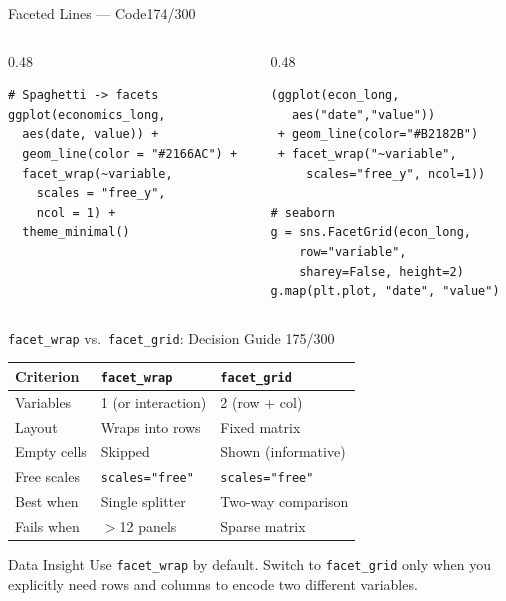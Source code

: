 \documentclass[10pt]{beamer}
\newcommand{\smark}[1]{\hfill{\scriptsize\color{codegray}#1}}
\begin{document}
\begin{frame}[fragile]{Faceted Lines --- Code}\smark{174/300}
\begin{columns}[T]
\begin{column}{0.48\textwidth}
\begin{lstlisting}[style=Rstyle]
# Spaghetti -> facets
ggplot(economics_long,
  aes(date, value)) +
  geom_line(color = "#2166AC") +
  facet_wrap(~variable,
    scales = "free_y",
    ncol = 1) +
  theme_minimal()
\end{lstlisting}
\end{column}
\begin{column}{0.48\textwidth}
\begin{lstlisting}[style=Pystyle]
(ggplot(econ_long,
   aes("date","value"))
 + geom_line(color="#B2182B")
 + facet_wrap("~variable",
     scales="free_y", ncol=1))

# seaborn
g = sns.FacetGrid(econ_long,
    row="variable",
    sharey=False, height=2)
g.map(plt.plot, "date", "value")
\end{lstlisting}
\end{column}
\end{columns}
\end{frame}

\begin{frame}{\texttt{facet\_wrap} vs.\ \texttt{facet\_grid}: Decision Guide}
\smark{175/300}
\centering\small
\begin{tabular}{@{}lll@{}}
    \toprule
    \textbf{Criterion} & \texttt{facet\_wrap} & \texttt{facet\_grid} \\
    \midrule
    Variables       & 1 (or interaction) & 2 (row + col) \\
    Layout          & Wraps into rows    & Fixed matrix \\
    Empty cells     & Skipped            & Shown (informative) \\
    Free scales     & \texttt{scales="free"} & \texttt{scales="free"} \\
    Best when       & Single splitter    & Two-way comparison \\
    Fails when      & $>$12 panels       & Sparse matrix \\
    \bottomrule
\end{tabular}

\vspace{0.3cm}
\begin{exampleblock}{Data Insight}
    \scriptsize Use \texttt{facet\_wrap} by default. Switch to \texttt{facet\_grid} only when you explicitly need rows and columns to encode two different variables.
\end{exampleblock}
\end{frame}
\end{document}
